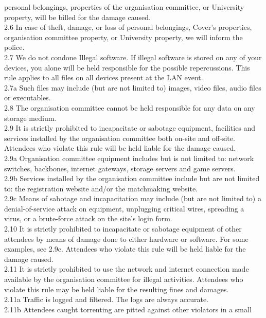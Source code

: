 \documentclass{article}
\begin{document}
personal belongings, properties of the organisation 
committee, or University property, will be billed for the damage caused.\\
2.6 In case of theft, damage, or loss of personal belongings, Cover’s 
properties, organisation committee property, or University property, we will 
inform the police.\\
2.7 We do not condone Illegal software. If illegal software is stored on any of 
your devices, you alone will be held responsible for the possible repercussions. 
This rule applies to all files on all devices present at the LAN event.\\
2.7a Such files may include (but are not limited to) images, video files, audio 
files or executables.\\
2.8 The organisation committee cannot be held responsible for any data on any 
storage medium.\\
2.9 It is strictly prohibited to incapacitate or sabotage equipment, facilities 
and services installed by the organisation committee both on-site and off-site. 
Attendees who violate this rule will be held liable for the damage caused.\\
2.9a Organisation committee equipment includes but is not limited to: network 
switches, backbones, internet gateways, storage servers and game servers.\\
2.9b Services installed by the organisation committee include but are not 
limited to: the registration website and/or the matchmaking website.\\
2.9c Means of sabotage and incapacitation may include (but are not limited to) a 
denial-of-service attack on equipment, unplugging critical wires, spreading a 
virus, or a brute-force attack on the site’s login form.\\
2.10 It is strictly prohibited to incapacitate or sabotage equipment of other 
attendees by means of damage done to either hardware or software. For some 
examples, see 2.9c. Attendees who violate this rule will be held liable for the 
damage caused.\\
2.11 It is strictly prohibited to use the network and internet connection made 
available by the organisation committee for illegal activities. Attendees who 
violate this rule may be held liable for the resulting fines and damages.\\
2.11a Traffic is logged and filtered. The logs are always accurate.\\
2.11b Attendees caught torrenting are pitted against other violators in a small
\end{document}
